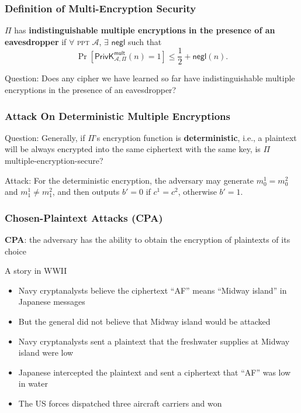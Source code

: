 \begin{frame}\frametitle{Definition of Multi-Encryption Security}
\begin{definition}\label{def:sme}
$\Pi$ has \textbf{indistinguishable multiple encryptions in the presence of an eavesdropper} if $\forall$ \textsc{ppt} $\mathcal{A}$, $\exists$ $\mathsf{negl}$ such that
\[ \Pr\left[\mathsf{PrivK}^{\mathsf{mult}}_{\mathcal{A},\Pi}(n)=1\right] \le \frac{1}{2} + \mathsf{negl}(n).
\]
\end{definition}
\begin{alertblock}{Question:}
Does any cipher we have learned so far have indistinguishable multiple encryptions in the presence of an eavesdropper?
\end{alertblock}
\end{frame}
\begin{frame}\frametitle{Attack On Deterministic Multiple Encryptions}
\begin{alertblock}{Question:}
Generally, if $\Pi$'s encryption function is \textbf{deterministic}, i.e., a plaintext will be always encrypted into the same ciphertext with the same key, is $\Pi$ multiple-encryption-secure?
\end{alertblock}
\begin{exampleblock}{Attack:}
For the deterministic encryption, the adversary may generate $m_0^1 = m_0^2$ and $m_1^1 \neq m_1^2$, and then outputs $b'=0$ if $c^1 = c^2$, otherwise $b'=1$.
\end{exampleblock}
\end{frame}
\begin{frame}\frametitle{Chosen-Plaintext Attacks (CPA)}
\textbf{CPA}: the adversary has the ability to obtain the encryption of plaintexts of its choice
\begin{exampleblock}{A story in WWII}
\begin{itemize}
\item Navy cryptanalysts believe the ciphertext ``AF'' means ``Midway island'' in Japanese messages
\item But the general did not believe that Midway island would be attacked
\item Navy cryptanalysts sent a plaintext that the freshwater supplies at Midway island were low
\item Japanese intercepted the plaintext and sent a ciphertext that ``AF'' was low in water
\item The US forces dispatched three aircraft carriers and won
\end{itemize}
\end{exampleblock}
\end{frame}
